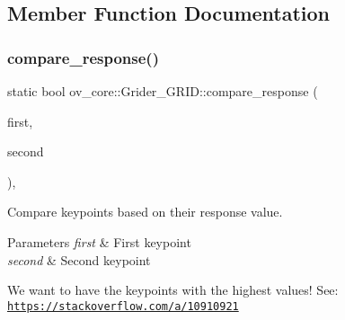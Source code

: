 \subsection{Member Function Documentation}
\mbox{\label{classov__core_1_1Grider__GRID_a6e78e323f7c99e2a13be240345c564f3}} 
\subsubsection{\texorpdfstring{compare\+\_\+response()}{compare\_response()}}
{\footnotesize\ttfamily static bool ov\+\_\+core\+::\+Grider\+\_\+\+G\+R\+I\+D\+::compare\+\_\+response (\begin{DoxyParamCaption}\item[{cv\+::\+Key\+Point}]{first,  }\item[{cv\+::\+Key\+Point}]{second }\end{DoxyParamCaption})\hspace{0.3cm}{\ttfamily [inline]}, {\ttfamily [static]}}



Compare keypoints based on their response value. 


\begin{DoxyParams}{Parameters}
{\em first} & First keypoint \\
\hline
{\em second} & Second keypoint\\
\hline
\end{DoxyParams}
We want to have the keypoints with the highest values! See\+: \href{https://stackoverflow.com/a/10910921}{\tt https\+://stackoverflow.\+com/a/10910921} \mbox{\label{classov__core_1_1Grider__GRID_a5021984f1ab36317c43ea3beddfd34e2}} 
